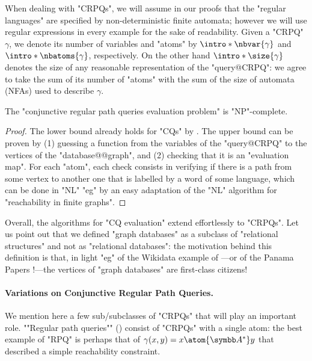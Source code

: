 
When dealing with "CRPQs", we will assume in our proofs that the "regular languages"
are specified by non-deterministic finite automata; however we will use
regular expressions in every example for the sake of readability.
Given a "CRPQ" $\gamma$, we denote its number of variables
and "atoms" by \AP$\intro*\nbvar{\gamma}$ and $\intro*\nbatoms{\gamma}$, respectively.
On the other hand $\intro*\size{\gamma}$ denotes the size of any reasonable representation
of the "query@CRPQ": we agree to take the sum of its number of "atoms" with
the sum of the size of automata (NFAs) used to describe $\gamma$.

\begin{proposition}
    The "conjunctive regular path queries evaluation problem" is "NP"-complete.
\end{proposition}

\begin{proof}
    The lower bound already holds for "CQs" by .
    The upper bound can be proven by (1) guessing a function from the variables
    of the "query@CRPQ" to the vertices of the "database@@graph",
    and (2) checking that it is an "evaluation map". 
    For each "atom", each check consists in verifying if there is a
    path from some vertex to another one that is labelled by a word of some language,
    which can be done in "NL" "eg" by an easy
    adaptation of the "NL" algorithm for "reachability in finite graphs".
\end{proof}


Overall, the algorithms for "CQ evaluation" extend effortlessly to "CRPQs". 
Let us point out that we defined "graph databases" as a subclass of
"relational structures" and not as "relational databases":
the motivation behind this definition is that,
in light "eg" of the Wikidata example of ---or  
of the Panama Papers \cite{Neo4jPanama}!---the vertices of "graph databases"
are first-class citizens!

\paragraph*{Variations on Conjunctive Regular Path Queries.}
We mention here a few sub/subclasses of "CRPQs" that will play an important role.
\AP""Regular path queries"" () consist of "CRPQs" with a single atom:
the best example of "RPQ" is perhaps that of $\gamma(x,y) = x \atom{\A^*} y$
that described a simple reachability constraint.

